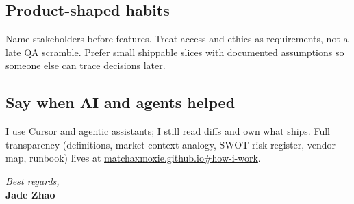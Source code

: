 \documentclass[11pt]{article}
\begin{document}
\subsection*{Product-shaped habits}
Name stakeholders before features. Treat access and ethics as requirements, not a late QA scramble. Prefer small shippable slices with documented assumptions so someone else can trace decisions later.

\subsection*{Say when AI and agents helped}
I use Cursor and agentic assistants; I still read diffs and own what ships. Full transparency (definitions, market-context analogy, SWOT risk register, vendor map, runbook) lives at \href{https://matchaxmoxie.github.io/matchaxmoxie/\#how-i-work}{matchaxmoxie.github.io\#how-i-work}.

\vspace{1em}
\noindent\textit{Best regards,}\\
\textbf{Jade Zhao}
\end{document}
